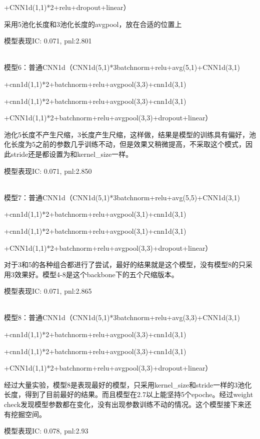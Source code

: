 \documentclass[11pt]{ctexart}
\begin{document}
+CNN1d(1,1)*2+relu+dropout+linear）

采用5池化长度和3池化长度的avgpool，放在合适的位置上

模型表现{\kaishu \small IC: 0.071, pnl:2.801}

~\\
模型6：普通CNN1d（CNN1d(5,1)*3batchnorm+relu+avg(5,1)+CNN1d(3,1)

+cnn1d(1,1)*2+batchnorm+relu+avgpool(3,3)+cnn1d(3,1)

+cnn1d(1,1)*2+batchnorm+relu+avgpool(3,3)+cnn1d(3,1)

+CNN1d(1,1)*2+batchnorm+relu+avgpool(3,3)+dropout+linear）

池化5长度不产生尺缩，3长度产生尺缩，这样做，结果是模型的训练具有偏好，池化长度为5之前的参数几乎训练不动，但是效果又稍微提高，不采取这个模式，因此stride还是都设置为和kernel\_size一样。

模型表现{\kaishu \small IC: 0.071, pnl:2.850}

~\\
模型7：普通CNN1d（CNN1d(5,1)*3batchnorm+relu+avg(5,5)+CNN1d(3,1)

+cnn1d(1,1)*2+batchnorm+relu+avgpool(3,1)+cnn1d(3,1)

+cnn1d(1,1)*2+batchnorm+relu+avgpool(3,1)+cnn1d(3,1)

+CNN1d(1,1)*2+batchnorm+relu+avgpool(3,3)+dropout+linear）

对于3和5的各种组合都进行了尝试，最好的结果就是这个模型，没有模型8的只采用3效果好。模型4-8是这个backbone下的五个尺缩版本。

模型表现{\kaishu \small IC: 0.071, pnl:2.865}


~\\
模型8：普通CNN1d（CNN1d(5,1)*3batchnorm+relu+avg(3,3)+CNN1d(3,1)

+cnn1d(1,1)*2+batchnorm+relu+avgpool(3,3)+cnn1d(3,1)

+cnn1d(1,1)*2+batchnorm+relu+avgpool(3,3)+cnn1d(3,1)

+CNN1d(1,1)*2+batchnorm+relu+avgpool(3,3)+dropout+linear）

经过大量实验，模型8是表现最好的模型，只采用kernel\_size和stride一样的3池化长度，得到了目前最好的结果。而且模型在2.7以上能坚持5个epoche。经过weight check发现模型参数都在变化，没有出现参数训练不动的情况。这个模型接下来还有挖掘空间。

模型表现{\kaishu \small IC: 0.078, pnl:2.93}
\end{document}
